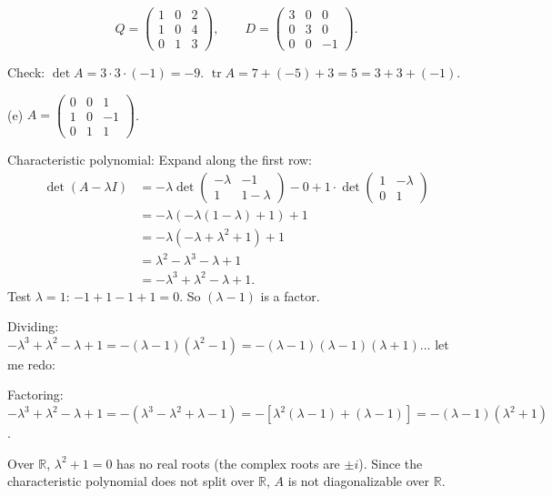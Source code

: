 \documentclass{article}
\begin{document}
\begin{mdframed}[linewidth=1pt]
\[
\boxed{Q = \begin{pmatrix} 1 & 0 & 2 \\ 1 & 0 & 4 \\ 0 & 1 & 3 \end{pmatrix}, \qquad D = \begin{pmatrix} 3 & 0 & 0 \\ 0 & 3 & 0 \\ 0 & 0 & -1 \end{pmatrix}.}
\]

\textnormal{Check:} $\det A = 3 \cdot 3 \cdot (-1) = -9$. $\operatorname{tr} A = 7 + (-5) + 3 = 5 = 3 + 3 + (-1)$.\end{mdframed}

\bigskip

\noindent\textnormal{(e)}
$A = \begin{pmatrix} 0 & 0 & 1 \\ 1 & 0 & -1 \\ 0 & 1 & 1 \end{pmatrix}$.

\begin{mdframed}[linewidth=1pt]
\textnormal{Characteristic polynomial:}
Expand along the first row:
\begin{align*}
\det(A - \lambda I) &= -\lambda \det\begin{pmatrix} -\lambda & -1 \\ 1 & 1-\lambda \end{pmatrix} - 0 + 1\cdot\det\begin{pmatrix} 1 & -\lambda \\ 0 & 1 \end{pmatrix} \\
&= -\lambda(-\lambda(1-\lambda) + 1) + 1 \\
&= -\lambda(-\lambda + \lambda^2 + 1) + 1 \\
&= \lambda^2 - \lambda^3 - \lambda + 1 \\
&= -\lambda^3 + \lambda^2 - \lambda + 1.
\end{align*}
Test $\lambda = 1$: $-1 + 1 - 1 + 1 = 0$. So $(\lambda - 1)$ is a factor.

Dividing: $-\lambda^3 + \lambda^2 - \lambda + 1 = -(\lambda - 1)(\lambda^2 - 1) = -(\lambda-1)(\lambda-1)(\lambda+1)$... let me redo:

Factoring: $-\lambda^3 + \lambda^2 - \lambda + 1 = -(\lambda^3 - \lambda^2 + \lambda - 1) = -[\lambda^2(\lambda - 1) + (\lambda - 1)] = -(\lambda-1)(\lambda^2 + 1)$.

Over $\mathbb{R}$, $\lambda^2 + 1 = 0$ has no real roots (the complex roots are $\pm i$). Since the characteristic polynomial does not split over $\mathbb{R}$, $A$ is \textnormal{not diagonalizable} over $\mathbb{R}$.
\end{mdframed}
\end{document}
